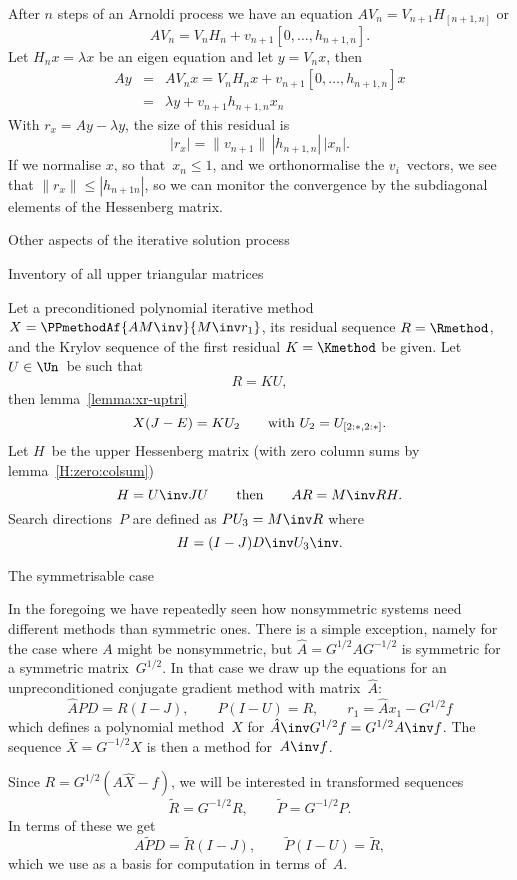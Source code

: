\documentclass[11pt]{artikel3}
\begin{document}
\begin{Outline}
After $n$ steps of an Arnoldi process we have an equation
$AV_n=V_{n+1}H_{[n+1,n]}$ or 
\[ AV_n=V_nH_n+v_{n+1}[0,\ldots,h_{n+1,n}]. \]
Let $H_nx=\lambda x$ be an eigen equation and let $y=V_nx$, then
\begin{eqnarray*} Ay&=&AV_nx=V_nH_nx+v_{n+1}[0,\ldots,h_{n+1,n}]x\\
    &=&\lambda y+v_{n+1}h_{n+1,n}x_n
\end{eqnarray*}
With $r_x=Ay-\lambda y$, the size of this residual is
\[ |r_x|=\|v_{n+1}\|\,|h_{n+1,n}|\,|x_n|. \]
If we normalise $x$, so that~$x_n\leq1$, and we orthonormalise the
$v_i$~vectors, we see that $\|r_x\|\leq|h_{n+1n}|$, so we can monitor
the convergence by the subdiagonal elements of the Hessenberg matrix.

 {Other aspects of the iterative solution process}

 {Inventory of all upper triangular matrices}

Let a preconditioned polynomial iterative method
$X=\PPmethodAf{AM\inv}{M\inv r_1}$,
its residual sequence $R=\Rmethod$, and the Krylov sequence of the
first residual $K=\Kmethod$ be given. Let $U\in\Un$~be such that \[
R=KU, \] then lemma~\ref{lemma:xr-uptri}
\[ X(J-E)=KU_2\qquad\hbox{with $U_2=U_{[2:*,2:*]}$}. \]
Let $H$~be the upper Hessenberg matrix (with zero column sums by
lemma~\ref{H:zero:colsum})
\[ H=U\inv JU\qquad\hbox{then}\qquad AR=M\inv RH. \]
Search directions~$P$ are defined as $PU_3=M\inv R$ where
\[H=(I-J)D\inv U_3\inv.\]

 {The symmetrisable case}
\FurtherReading

In the foregoing we have repeatedly seen how nonsymmetric systems
need different methods than symmetric ones. There is a simple
exception, namely for the case where $A$ might be nonsymmetric,
but $\hat A=G^{1/2}AG^{-1/2}$ is symmetric for a symmetric matrix~$G^{1/2}$.
In that case we draw up the equations for
an unpreconditioned conjugate gradient method with matrix~$\hat A$:
\begin{equation} \hat APD=R(I-J),\qquad P(I-U)=R,\qquad
     r_1=\hat Ax_1-G^{1/2}f
    \label{eq:cg_symmable}\end{equation}
which defines a polynomial method~$X$ for $\hat A\inv G^{1/2}f=G^{1/2}A\inv f$.
The sequence $\bar X=G^{-1/2}X$ is then a method for~$A\inv f$.

Since $R=G^{1/2}(A\hat X-f)$, we will be interested in
transformed sequences
\begin{equation} \tilde R=G^{-1/2}R,\qquad \tilde P=G^{-1/2}P.
    \label{eq:symble-trans1}\end{equation}
In terms of these we get 
\begin{equation}
     A\tilde PD=\tilde R(I-J),\qquad \tilde P(I-U)=\tilde R,
        \label{eq:cg_symmable1}\end{equation}
which we use as a basis for computation in terms of~$A$.


\end{Outline}
\end{document}
